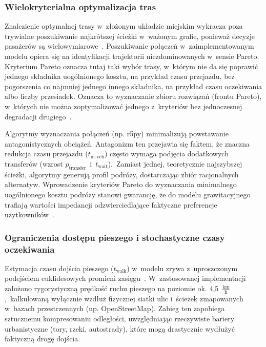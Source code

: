 \documentclass{pracamgr}
\begin{document}
\subsubsection{Wielokryterialna optymalizacja tras}

Znalezienie optymalnej trasy w~złożonym układzie miejskim wykracza poza trywialne poszukiwanie najkrótszej ścieżki w~ważonym grafie, ponieważ decyzje pasażerów są wielowymiarowe~\cite{graph}. Poszukiwanie połączeń w~zaimplementowanym modelu opiera się na identyfikacji trajektorii niezdominowanych w~sensie Pareto. Kryterium Pareto oznacza tutaj taki wybór trasy, w~którym nie da się poprawić jednego składnika uogólnionego kosztu, na przykład czasu przejazdu, bez pogorszenia co najmniej jednego innego składnika, na przykład czasu oczekiwania albo liczby przesiadek. Oznacza to wyznaczanie zbioru rozwiązań (frontu Pareto), w~których nie można zoptymalizować jednego z~kryteriów bez jednoczesnej degradacji drugiego~\cite{review, LUO2019102505}.

Algorytmy wyznaczania połączeń (np. r5py) minimalizują powstawanie antagonistycznych obciążeń. Antagonizm ten przejawia się faktem, że znaczna redukcja czasu przejazdu ($t_{\text{in-veh}}$) często wymaga podjęcia dodatkowych transferów (wzrost $p_{\text{transfer}}$~i~$t_{\text{wait}}$).~Zamiast jednej, teoretycznie najszybszej ścieżki, algorytmy generują profil podróży, dostarczając zbiór racjonalnych alternatyw. Wprowadzenie kryteriów Pareto do wyznaczania minimalnego uogólnionego kosztu podróży stanowi gwarancję, że do modelu grawitacyjnego trafiają wartości impedancji odzwierciedlające faktyczne preferencje użytkowników~\cite{LUO2019102505, robustness, gravity2}.

\subsubsection{Ograniczenia dostępu pieszego i stochastyczne czasy oczekiwania}

Estymacja czasu dojścia pieszego ($t_{\text{walk}}$) w~modelu zrywa z~uproszczonym podejściem euklidesowych promieni zasięgu~\cite{capetown}. W~zastosowanej implementacji założono rygorystyczną prędkość ruchu pieszego na poziomie ok. 4,5~$\frac{\text{km}}{\text{h}}$,~kalkulowaną wyłącznie wzdłuż fizycznej siatki ulic i~ścieżek zmapowanych w~bazach przestrzennych (np. OpenStreetMap). Zabieg ten zapobiega sztucznemu kompresowaniu odległości, uwzględniając rzeczywiste bariery urbanistyczne (tory, rzeki, autostrady), które mogą drastycznie wydłużyć faktyczną drogę dojścia.
\end{document}
